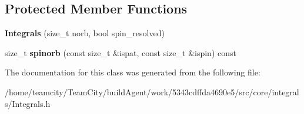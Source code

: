 \subsection*{Protected Member Functions}
\begin{DoxyCompactItemize}
\item 
{\bfseries Integrals} (size\+\_\+t norb, bool spin\+\_\+resolved)\hypertarget{classIntegrals_a0b446807fda4d429a289a064aa7948fe}{}\label{classIntegrals_a0b446807fda4d429a289a064aa7948fe}

\item 
size\+\_\+t {\bfseries spinorb} (const size\+\_\+t \&ispat, const size\+\_\+t \&ispin) const \hypertarget{classIntegrals_aa5c24ad66ebd1b881b3b20dfc37d4323}{}\label{classIntegrals_aa5c24ad66ebd1b881b3b20dfc37d4323}

\end{DoxyCompactItemize}


The documentation for this class was generated from the following file\+:\begin{DoxyCompactItemize}
\item 
/home/teamcity/\+Team\+City/build\+Agent/work/5343cdffda4690e5/src/core/integrals/Integrals.\+h\end{DoxyCompactItemize}
